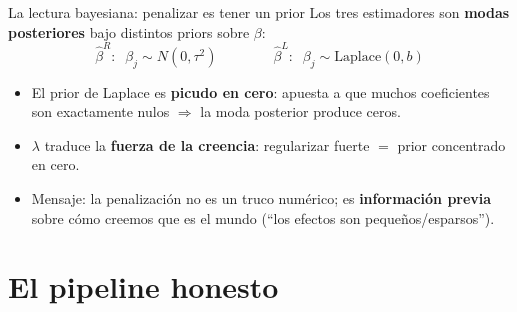 \documentclass{beamer}
\newcommand{\1}{\mathbb{I}}
\begin{document}
\begin{frame}{La lectura bayesiana: penalizar es tener un prior}
\small
Los tres estimadores son \textbf{modas posteriores} bajo distintos priors sobre $\beta$:
\[ \hat{\beta}^{R}: \;\; \beta_j \sim N(0, \tau^2) \qquad\qquad
   \hat{\beta}^{L}: \;\; \beta_j \sim \mathrm{Laplace}(0, b) \]
\pause

\begin{center}
\end{center}
\pause

\begin{itemize}\itemsep3pt
  \item El prior de Laplace es \textbf{picudo en cero}: apuesta a que muchos coeficientes son exactamente nulos $\Rightarrow$ la moda posterior produce ceros.
  \item $\lambda$ traduce la \textbf{fuerza de la creencia}: regularizar fuerte $=$ prior concentrado en cero.
  \item Mensaje: la penalización no es un truco numérico; es \textbf{información previa} sobre cómo creemos que es el mundo (``los efectos son pequeños/esparsos'').
\end{itemize}
\end{frame}


\section{El pipeline honesto}
\begin{frame}[noframenumbering]
\tableofcontents[currentsection]
\end{frame}
\end{document}
